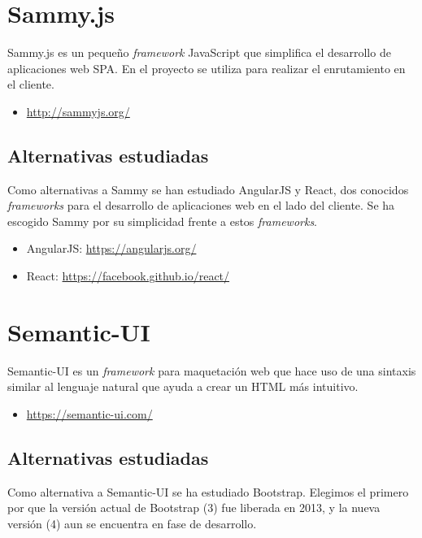 \section{Sammy.js}

Sammy.js es un pequeño \textit{framework} JavaScript que simplifica el desarrollo de aplicaciones web SPA.
En el proyecto se utiliza para realizar el enrutamiento en el cliente.

\begin{itemize}
	\item \url{http://sammyjs.org/}
\end{itemize}

\subsection{Alternativas estudiadas}

Como alternativas a Sammy se han estudiado AngularJS y React, dos conocidos \textit{frameworks} para el desarrollo de aplicaciones web en el lado del cliente. Se ha escogido Sammy por su simplicidad frente a estos \textit{frameworks}.

\begin{itemize}
	\item AngularJS: \url{https://angularjs.org/}
	\item React: \url{https://facebook.github.io/react/}
\end{itemize}

\section{Semantic-UI}

Semantic-UI es un \textit{framework} para maquetación web que hace uso de una sintaxis similar al lenguaje natural que ayuda a crear un HTML más intuitivo.

\begin{itemize}
	\item \url{https://semantic-ui.com/}
\end{itemize}

\subsection{Alternativas estudiadas}

Como alternativa a Semantic-UI se ha estudiado Bootstrap. Elegimos el primero por que la versión actual de Bootstrap (3) fue liberada en 2013, y la nueva versión (4) aun se encuentra en fase de desarrollo.

